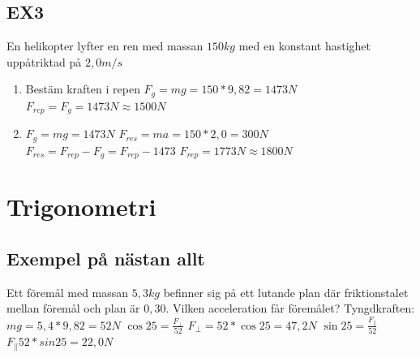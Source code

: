 \documentclass[a4paper,11pt]{article}
\begin{document}
\begin{flushleft}
\subsection{EX3}
En helikopter lyfter en ren med massan $150kg$ med en konstant hastighet uppåtriktad på $2,0m/s$\newline
\begin{enumerate}
  \item Bestäm kraften i repen\newline
  $ F_g = mg = 150*9,82 = 1473N $\newline
  $ F_{rep} = F_g = 1473N \approx 1500N$\newline
  \item $ F_g = mg = 1473N $\newline
  $ F_{res} = ma = 150*2,0 = 300N $\newline
  $ F_{res} = F_{rep}-F_g = F_{rep}-1473 $\newline
  $ F_{rep} = 1773N \approx 1800N $\newline  
\end{enumerate}
\section{Trigonometri}
\subsection{Exempel på nästan allt}
Ett föremål med massan $5,3kg$ befinner sig på ett lutande plan där friktionstalet mellan föremål och plan är $0,30$.\newline
Vilken acceleration får föremålet?\newline
Tyngdkraften: $mg = 5,4*9,82 = 52N$\newline
$ \cos 25 = \frac{F_{\perp}}{52} $\newline
$ F_{\perp} = 52 * \cos 25 = 47,2 N $\newline
$ \sin 25 = \frac{F_{\parallel}}{52} $\newline
$ F_{\parallel} 52*sin 25 = 22,0 N $\newline


\end{flushleft}
\end{document}
